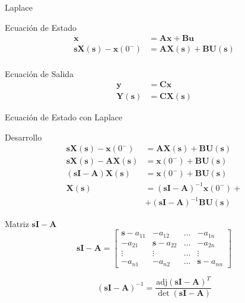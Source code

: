 \documentclass[aspectratio=169, usenames,svgnames,dvipsnames]{beamer}
\newcommand{\laplace}[1]{\mathbf{#1}(\mathbf{s})}
\newcommand{\slp}{\mathbf{s}}
\begin{document}
\begin{frame}[label={sec:org2d3ffcd}]{Laplace}
\begin{block}{Ecuación de Estado}
\begin{align*}
  \dot{\mathbf{x}} &= \mathbf{A}\mathbf{x} + \mathbf{B}\mathbf{u}\\
  \slp \laplace{X} - \mathbf{x}(0^-) &= \mathbf{A}\laplace{X} + \mathbf{B}\laplace{U}\\
\end{align*}
\end{block}
\begin{block}{Ecuación de Salida}
\begin{align*}
  \mathbf{y} &= \mathbf{C}\mathbf{x}\\
  \laplace{Y} &= \mathbf{C}\laplace{X}
\end{align*}
\end{block}
\end{frame}
\begin{frame}[label={sec:org02fc182}]{Ecuación de Estado con Laplace}
\begin{block}{Desarrollo}
\begin{align*}
  \slp \laplace{X} - \mathbf{x}(0^-) &= \mathbf{A}\laplace{X} + \mathbf{B}\laplace{U}\\
  \slp \laplace{X} - \mathbf{A}\laplace{X} &= \mathbf{x}(0^-) + \mathbf{B}\laplace{U}\\
  \left(\slp \mathbf{I} - \mathbf{A} \right) \laplace{X} &= \mathbf{x}(0^-) + \mathbf{B}\laplace{U}\\
  \laplace{X} &= \left(\slp \mathbf{I} - \mathbf{A} \right)^{-1} \mathbf{x}(0^-) +\\ 
  &+ \left(\slp \mathbf{I} - \mathbf{A} \right)^{-1} \mathbf{B}\laplace{U}
\end{align*}
\end{block}
\end{frame}

\begin{frame}[label={sec:orgd9e6a1a}]{Matriz \(\slp \mathbf{I} - \mathbf{A}\)}
\[
\slp \mathbf{I} - \mathbf{A} = 
\begin{bmatrix} 
\slp - a_{11} & -a_{12} & \dots & -a_{1n}\\
- a_{21} & \slp -a_{22} & \dots & -a_{2n}\\
\vdots & \vdots & \dots & \vdots \\
- a_{n1} & -a_{n2} & \dots & \slp - a_{nn}
\end{bmatrix}
\]

\[
\left(\slp \mathbf{I} - \mathbf{A} \right)^{-1} = \frac{\text{adj}(\slp \mathbf{I} - \mathbf{A})^T}{\det(\slp \mathbf{I} - \mathbf{A})}
\]
\end{frame}
\end{document}

